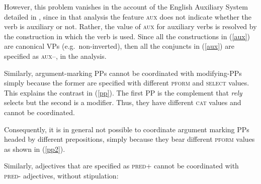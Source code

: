 \documentclass[output=paper]{langsci/langscibook}
\begin{document}
\noindent
However, this problem vanishes in the account of the English Auxiliary System detailed in \citet{SagEtAl20}, since in that analysis
the feature \textsc{aux} does not indicate whether the verb is auxiliary or not. Rather, the value of \textsc{aux} for auxiliary verbs is resolved by the construction in which the verb is used. Since all the constructions in (\ref{aux}) are canonical VPs (e.g.\ non-inverted), then 
all the conjuncts in (\ref{aux}) are specified as \textsc{aux--}, in
the \citet{SagEtAl20} analysis.




Similarly, argument-marking PPs cannot be coordinated with modifying-PPs simply because the former are specified with different  \textsc{pform} and \textsc{select} values. This explains the contrast
in (\ref{pp}). The first PP is the complement that \emph{rely}
selects but the second is a modifier. Thus, they have different \textsc{cat} values and cannot be coordinated.


\begin{exe}
\ex
\begin{xlista}
\end{xlista}\label{pp}
\end{exe}

\noindent
Consequently, it is in general not possible to coordinate argument marking PPs headed by different prepositions, simply because they bear
different \textsc{pform} values as shown in (\ref{pp2}).

\begin{exe}
\ex
\begin{xlista}

\end{xlista}\label{pp2}
\end{exe}

Similarly, adjectives that are specified as \textsc{pred+} cannot be
coordinated with  \textsc{pred-} adjectives, without stipulation:

\begin{exe}
\ex
\begin{xlista}
 \end{xlista}
\end{exe}
\end{document}
